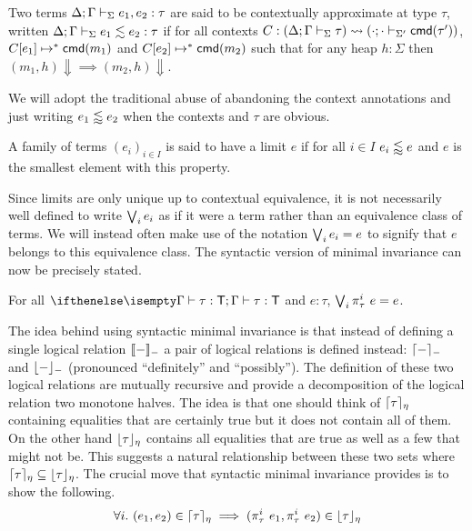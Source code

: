 \begin{defn}\label{def:smi:contextual-approximation}
  Two terms $\Delta; \Gamma \vdash_{\Sigma} e_1, e_2 \mathrel{:} \tau$ are
  said to be contextually approximate at type $\tau$, written
  $\Delta; \Gamma \vdash_{\Sigma} e_1 \lesssim e_2 \mathrel{:} \tau$ if for all
  contexts
  $C : (\Delta; \Gamma \vdash_{\Sigma} \tau) \rightsquigarrow (\cdot; \cdot \vdash_{\Sigma'} \mathsf{cmd}(\tau'))$,
  $C[e_1] \mapsto^* \mathsf{cmd}(m_1)$ and $C[e_2] \mapsto^* \mathsf{cmd}(m_2)$ such
  that for any heap $h : \Sigma$ then
  $(m_1, h) \Downarrow \implies (m_2, h) \Downarrow$.
\end{defn}
We will adopt the traditional abuse of abandoning the context
annotations and just writing $e_1 \lessapprox e_2$ when the contexts and
$\tau$ are obvious.
\begin{defn}\label{def:smi:contextual-limits}
  A family of terms $(e_i)_{i \in I}$ is said to have a limit $e$ if
  for all $i \in I$ $e_i \lessapprox e$ and $e$ is the smallest element
  with this property.
\end{defn}
Since limits are only unique up to contextual equivalence, it is not
necessarily well defined to write $\bigvee_i e_i$ as if it were a term
rather than an equivalence class of terms. We will instead often make
use of the notation $\bigvee_i e_i = e$ to signify that $e$ belongs to
this equivalence class. The syntactic version of minimal
invariance can now be precisely stated.
\begin{thm}\label{thm:smi:smi}
  For all $\hasTJ{}{\Gamma}{\tau}{\tp}$ and $e : \tau$,
  $\bigvee_i \pi_\tau^i\ e = e$.
\end{thm}
The idea behind using syntactic minimal invariance is that instead of
defining a single logical relation $\llbracket - \rrbracket_{-}$ a pair of logical
relations is defined instead: $\lceil - \rceil_{-}$ and
$\lfloor - \rfloor_{-}$ (pronounced ``definitely'' and ``possibly''). The
definition of these two logical relations are mutually recursive and
provide a decomposition of the logical relation two monotone
halves. The idea is that one should think of
$\lceil \tau \rceil_{\eta}$ containing equalities that are certainly
true but it does not contain all of them. On the other hand
$\lfloor \tau \rfloor_\eta$ contains all equalities that are true as well
as a few that might not be. This suggests a natural relationship
between these two sets where
$\lceil \tau \rceil_\eta \subseteq \lfloor \tau \rfloor_\eta$. The crucial
move that syntactic minimal invariance provides is to show the
following.
\[
  \forall i.\ (e_1, e_2) \in \lceil \tau \rceil_\eta \implies
  (\pi_\tau^i\ e_1, \pi_\tau^i\ e_2) \in \lfloor \tau \rfloor_\eta
\]
